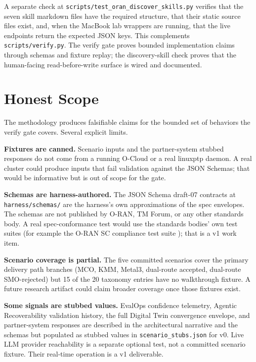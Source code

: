 \documentclass[twocolumn,10pt,a4paper]{article}
\begin{document}
A separate check at \texttt{scripts/test\_oran\_discover\_skills.py} verifies that the seven skill markdown files have the required structure, that their static source files exist, and, when the MacBook lab wrappers are running, that the live endpoints return the expected JSON keys. This complements \texttt{scripts/verify.py}. The verify gate proves bounded implementation claims through schemas and fixture replay; the discovery-skill check proves that the human-facing read-before-write surface is wired and documented.

\section{Honest Scope}

The methodology produces falsifiable claims for the bounded set of behaviors the verify gate covers. Several explicit limits.

\textbf{Fixtures are canned.} Scenario inputs and the partner-system stubbed responses do not come from a running O-Cloud or a real linuxptp daemon. A real cluster could produce inputs that fail validation against the JSON Schemas; that would be informative but is out of scope for the gate.

\textbf{Schemas are harness-authored.} The JSON Schema draft-07 contracts at \texttt{harness/schemas/} are the harness's own approximations of the spec envelopes. The schemas are not published by O-RAN, TM Forum, or any other standards body. A real spec-conformance test would use the standards bodies' own test suites (for example the O-RAN SC compliance test suite \cite{oran_sc_it_test}); that is a v1 work item.

\textbf{Scenario coverage is partial.} The five committed scenarios cover the primary delivery path branches (MCO, KMM, Metal3, dual-route accepted, dual-route SMO-rejected) but 15 of the 20 taxonomy entries have no walkthrough fixture. A future research artifact could claim broader coverage once those fixtures exist.

\textbf{Some signals are stubbed values.} EvalOps confidence telemetry, Agentic Recoverability validation history, the full Digital Twin convergence envelope, and partner-system responses are described in the architectural narrative and the schemas but populated as stubbed values in \texttt{scenario\_stubs.json} for v0. Live LLM provider reachability is a separate optional test, not a committed scenario fixture. Their real-time operation is a v1 deliverable.
\end{document}
